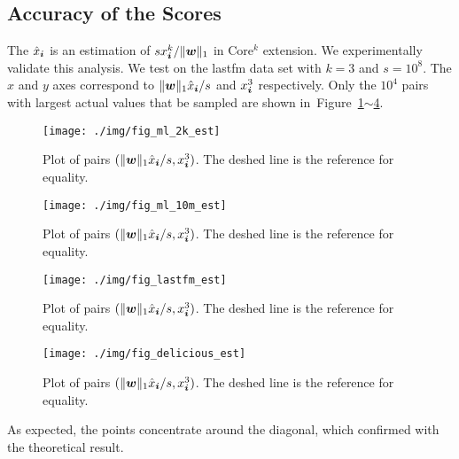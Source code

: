 \documentclass[letterpaper]{article}
\newcommand{\V}[1]{{\boldsymbol{{\MakeLowercase{#1}}}}}
\newcommand{\predx}{\hat{x}_{\V{i}}}
\newcommand{\norm}[2]{\|#1\|_{#2}}
\newcommand{\Figs}[2]{Figure~\ref{fig:#1}$\sim$\ref{fig:#2}}
\begin{document}
\subsection{Accuracy of the Scores}
The $\predx$ is an estimation of $sx^k_{\V{i}}/\norm{\V{w}}{1}$ in Core$^k$ extension.
We experimentally validate this analysis.
We test on the lastfm data set with $k=3$ and $s=10^8$.
The $x$ and $y$ axes correspond to $\norm{\V{w}}{1}\hat{x}_{\V{i}}/s$ and $x^3_{\V{i}}$ respectively. 
Only the $10^4$ pairs with largest actual values that be sampled are shown in~\Figs{ml_2k_est}{delicious_est}.
\begin{figure}[H]
  \centering
  \texttt{[image: ./img/fig\_ml\_2k\_est]}\\
  \caption{Plot of pairs $(\norm{\V{w}}{1}\hat{x}_{\V{i}}/s,x^3_{\V{i}})$.
          The deshed line is the reference for equality.}
  \label{fig:ml_2k_est}
\end{figure}
\begin{figure}[H]
  \centering
  \texttt{[image: ./img/fig\_ml\_10m\_est]}\\
  \caption{Plot of pairs $(\norm{\V{w}}{1}\hat{x}_{\V{i}}/s,x^3_{\V{i}})$.
          The deshed line is the reference for equality.}
  \label{fig:ml_10m_est}
\end{figure}
\begin{figure}[H]
  \centering
  \texttt{[image: ./img/fig\_lastfm\_est]}\\
  \caption{Plot of pairs $(\norm{\V{w}}{1}\hat{x}_{\V{i}}/s,x^3_{\V{i}})$.
          The deshed line is the reference for equality.}
  \label{fig:lastfm_est}
\end{figure}
\begin{figure}[H]
  \centering
  \texttt{[image: ./img/fig\_delicious\_est]}\\
  \caption{Plot of pairs $(\norm{\V{w}}{1}\hat{x}_{\V{i}}/s,x^3_{\V{i}})$.
          The deshed line is the reference for equality.}
  \label{fig:delicious_est}
\end{figure}

As expected, the points concentrate around the diagonal, 
which confirmed with the theoretical result.


\end{document}
